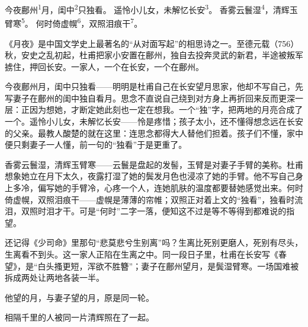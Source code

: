 
\begin{poem}
今夜鄜州\textsuperscript{1}月，闺中\textsuperscript{2}只独看。
遥怜小儿女，未解忆长安\textsuperscript{3}。
香雾云鬟湿\textsuperscript{4}，清辉玉臂寒\textsuperscript{5}。
何时倚虚幌\textsuperscript{6}，双照泪痕干\textsuperscript{7}。
\end{poem}

\begin{annotations}
\end{annotations}

\begin{appreciation}
《月夜》是中国文学史上最著名的“从对面写起”的相思诗之一。至德元载（756）秋，安史之乱初起，杜甫把家小安置在鄜州，独自去投奔灵武的新君，半途被叛军掳住，押回长安。一家人，一个在长安，一个在鄜州。

今夜鄜州月，闺中只独看——明明是杜甫自己在长安望月思家，他却不写自己，先写妻子在鄜州的闺中独自看月。思念不直说自己绕到对方身上再折回来反而更深一层：正因为想她，才断定她此刻也一定在想我。一个“独”字，把两地的月亮合成了一个。遥怜小儿女，未解忆长安——怜是疼惜；孩子太小，还不懂得想念远在长安的父亲。最教人酸楚的就在这里：连思念都得大人替他们担着。孩子们不懂，家中便只剩妻子一人懂，前一句的“独看”于是更重了。

香雾云鬟湿，清辉玉臂寒——云鬟是盘起的发髻，玉臂是对妻子手臂的美称。杜甫想象她立在月下太久，夜露打湿了她的鬓发月色也浸凉了她的手臂。他不写自己身上多冷，偏写她的手臂冷，心疼一个人，连她肌肤的温度都要替她感觉出来。何时倚虚幌，双照泪痕干——虚幌是薄薄的帘帷；双照正对着上文的“独看”，独看时流泪，双照时泪才干。可是“何时”二字一落，便知这不过是等不等得到都难说的指望。

还记得《少司命》里那句“悲莫悲兮生别离”吗？生离比死别更磨人，死别有尽头，生离看不到头。这一家人正陷在生离之中。同一段日子里，杜甫在长安写《春望》，是“白头搔更短，浑欲不胜簪”；妻子在鄜州望月，是鬓湿臂寒。一场国难被拆成两处让两地各装一半。

他望的月，与妻子望的月，原是同一轮。

相隔千里的人被同一片清辉照在了一起。
\end{appreciation}
